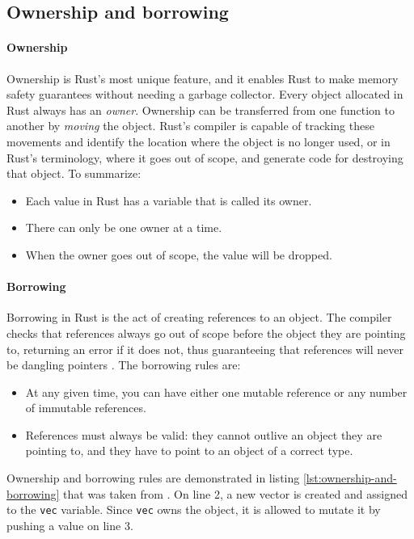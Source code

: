 \subsection{Ownership and borrowing}

\paragraph{Ownership}
Ownership is Rust's most unique feature, and it enables Rust to make memory safety guarantees without needing a garbage collector. Every object allocated in Rust always has an \emph{owner}. Ownership can be transferred from one function to another by \emph{moving} the object. Rust's compiler is capable of tracking these movements and identify the location where the object is no longer used, or in Rust's terminology, where it goes out of scope, and generate code for destroying that object. To summarize:

\begin{itemize}
    \item Each value in Rust has a variable that is called its owner.
    \item There can only be one owner at a time.
    \item When the owner goes out of scope, the value will be dropped.
\end{itemize}

\paragraph{Borrowing}
Borrowing in Rust is the act of creating references to an object. The compiler checks that references always go out of scope before the object they are pointing to, returning an error if it does not, thus guaranteeing that references will never be dangling pointers \cite{reed-patina}. The borrowing rules are:

\begin{itemize}
    \item At any given time, you can have either one mutable reference or any number of immutable references.
    \item References must always be valid: they cannot outlive an object they are pointing to, and they have to point to an object of a correct type.
\end{itemize}

Ownership and borrowing rules are demonstrated in listing \ref{lst:ownership-and-borrowing} that was taken from \cite{linus-parallelization}. On line 2, a new vector is created and assigned to the \texttt{vec} variable. Since \texttt{vec} owns the object, it is allowed to mutate it by pushing a value on line 3.


